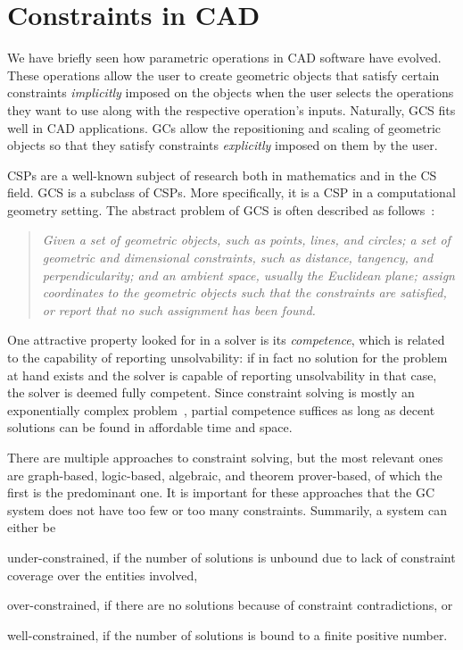\section{Constraints in CAD}%
\label{sec:intro.constraints}

We have briefly seen how parametric operations in \ac{CAD} software have
evolved.  These operations allow the user to create geometric objects that
satisfy certain constraints \emph{implicitly} imposed on the objects when the
user selects the operations they want to use along with the respective
operation's inputs.  Naturally, \ac{GCS} fits well in \ac{CAD} applications.
\Acp{GC} allow the repositioning and scaling of geometric objects so that they
satisfy constraints \emph{explicitly} imposed on them by the user.

\acp{CSP} are a well-known subject of research both in mathematics and in the
\ac{CS} field.  \ac{GCS} is a subclass of \acp{CSP}. More specifically, it is a
\ac{CSP} in a computational geometry setting.  The abstract problem of \ac{GCS}
is often described as follows~\cite[pp.~6]{Bettig:2011:GCSPC}:

\newpage
\begin{quote}
  {\itshape\color{gray}
  Given a set of geometric objects, such as points, lines, and circles; a set of
  geometric and dimensional constraints, such as distance, tangency, and
  perpendicularity; and an ambient space, usually the Euclidean plane; assign
  coordinates to the geometric objects such that the constraints are satisfied,
  or report that no such assignment has been found.}
\end{quote}

One attractive property looked for in a solver is its \emph{competence}, which
is related to the capability of reporting unsolvability: if in fact no solution
for the problem at hand exists and the solver is capable of reporting
unsolvability in that case, the solver is deemed fully competent.  Since
constraint solving is mostly an exponentially complex
problem~\cite{Rossi:2006:Handbook}, partial competence suffices as long as
decent solutions can be found in affordable time and space.

There are multiple approaches to constraint solving, but the most relevant ones
are graph-based, logic-based, algebraic, and theorem prover-based, of which the
first is the predominant one.  It is important for these approaches that the
\ac{GC} system does not have too few or too many constraints.  Summarily, a
system can either be 
\begin{enumerate*}[label= (\arabic*)]
  \item under-constrained, if the number of solutions is unbound due to lack of
  constraint coverage over the entities involved,
  \item over-constrained, if there are no solutions because of constraint
  contradictions, or
  \item well-constrained, if the number of solutions is bound to a finite
  positive number.
\end{enumerate*}

